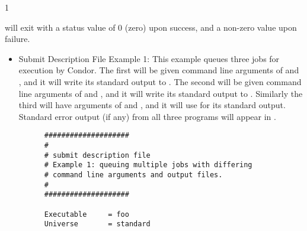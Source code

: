 \begin{ManPage}{\label{man-condor-submit}}{1}
\begin{Options}



\end{Options}

\ExitStatus

 will exit with a status value of 0 (zero) upon success, and a
non-zero value upon failure.

\Examples

\begin{itemize} 
\item{Submit Description File Example 1:} This example queues three jobs for
execution by Condor. The first will be given command line arguments of
 and , and it will write its standard output
to .
The second will be given command line arguments of 
 and , and it will
write its standard output to .
Similarly the third will have
arguments of 
 and , and it will use  for its standard
output. Standard error output (if any) from all three programs will
appear in .

\begin{verbatim}
      ####################
      #
      # submit description file
      # Example 1: queuing multiple jobs with differing
      # command line arguments and output files.
      #                                                                      
      ####################                                                   
                                                                         
      Executable     = foo                                                   
      Universe       = standard
                                                                         

\end{verbatim}
\end{itemize}
\end{ManPage}
